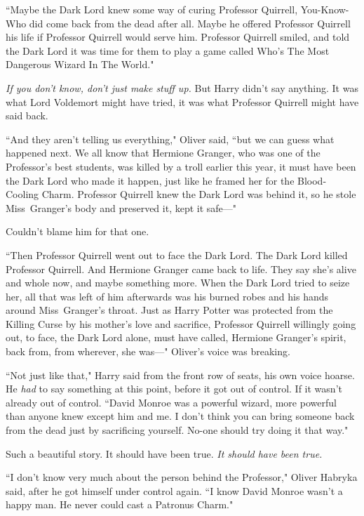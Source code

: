 ``Maybe the Dark Lord knew some way of curing Professor Quirrell, You-Know-Who did come back from the dead after all. Maybe he offered Professor Quirrell his life if Professor Quirrell would serve him. Professor Quirrell smiled, and told the Dark Lord it was time for them to play a game called Who's The Most Dangerous Wizard In The World."

\emph{If you don't know, don't just make stuff up.} But Harry didn't say anything. It was what Lord Voldemort might have tried, it was what Professor Quirrell might have said back.

``And they aren't telling us everything," Oliver said, ``but we can guess what happened next. We all know that Hermione Granger, who was one of the Professor's best students, was killed by a troll earlier this year, it must have been the Dark Lord who made it happen, just like he framed her for the Blood-Cooling Charm. Professor Quirrell knew the Dark Lord was behind it, so he stole Miss~Granger's body and preserved it, kept it safe—"

Couldn't blame him for that one.

``Then Professor Quirrell went out to face the Dark Lord. The Dark Lord killed Professor Quirrell. And Hermione Granger came back to life. They say she's alive and whole now, and maybe something more. When the Dark Lord tried to seize her, all that was left of him afterwards was his burned robes and his hands around Miss~Granger's throat. Just as Harry Potter was protected from the Killing Curse by his mother's love and sacrifice, Professor Quirrell willingly going out, to face, the Dark Lord alone, must have called, Hermione Granger's spirit, back from, from wherever, she was—" Oliver's voice was breaking.

``Not just like that," Harry said from the front row of seats, his own voice hoarse. He \emph{had} to say something at this point, before it got out of control. If it wasn't already out of control. ``David Monroe was a powerful wizard, more powerful than anyone knew except him and me. I don't think you can bring someone back from the dead just by sacrificing yourself. No-one should try doing it that way."

Such a beautiful story. It should have been true. \emph{It should have been true.}

``I don't know very much about the person behind the Professor," Oliver Habryka said, after he got himself under control again. ``I know David Monroe wasn't a happy man. He never could cast a Patronus Charm."

